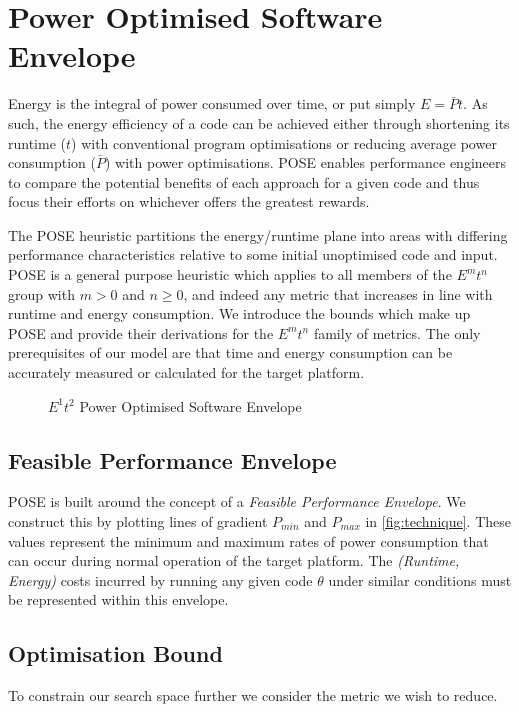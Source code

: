 \section{Power Optimised Software Envelope}
\label{sec:pose}
\noindent
Energy is the integral of power consumed over time, or put simply $E = \bar{P}t$.
As such, the energy efficiency of a code can be achieved either through shortening its runtime ($t$) with conventional program optimisations or reducing average power consumption ($\bar{P}$) with power optimisations.
POSE enables performance engineers to compare the potential benefits of each approach for a given code and thus focus their efforts on whichever offers the greatest rewards.

The POSE heuristic partitions the energy/runtime plane into areas with differing performance characteristics relative to some initial unoptimised code and input.
POSE is a general purpose heuristic which applies to all members of the $E^mt^n$ group with $m > 0$ and $n \geq 0$, and indeed any metric that increases in line with runtime and energy consumption.
We introduce the bounds which make up POSE and provide their derivations for the $E^mt^n$ family of metrics.
The only prerequisites of our model are that time and energy consumption can be accurately measured or calculated for the target platform.

\begin{figure}
\scriptsize
\centering

\caption{$E^1t^2$ Power Optimised Software Envelope}
\label{fig:technique}
\end{figure}

\subsection{Feasible Performance Envelope}
\noindent
POSE is built around the concept of a \emph{Feasible Performance Envelope}.
We construct this by plotting lines of gradient $P_{min}$ and $P_{max}$ in \autoref{fig:technique}.
These values represent the minimum and maximum rates of power consumption that can occur during normal operation of the target platform.
The \textit{(Runtime, Energy)} costs incurred by running any given code $\theta$ under similar conditions must be represented within this envelope.

\subsection{Optimisation Bound}
\noindent
To constrain our search space further we consider the metric we wish to reduce.

